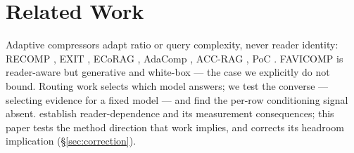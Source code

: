 \section{Related Work}
\label{sec:related}

Adaptive compressors adapt ratio or query complexity, never reader identity:
RECOMP \citep{xu2024recomp}, EXIT \citep{hwang2025exit}, ECoRAG
\citep{jeong2025ecorag}, AdaComp \citep{adacomp2024}, ACC-RAG
\citep{accrag2025}, PoC \citep{poc2026}. FAVICOMP \citep{jung2025favicomp} is
reader-aware but generative and white-box --- the case we explicitly do not
bound. Routing work \citep{ong2024routellm, inferencedynamics2026,
routeprofile2026} selects which model answers; we test the converse ---
selecting evidence for a fixed model --- and find the per-row conditioning
signal absent. \citet{panthi2026fixed} establish reader-dependence and its
measurement consequences; this paper tests the method direction that work
implies, and corrects its headroom implication (\S\ref{sec:correction}).
